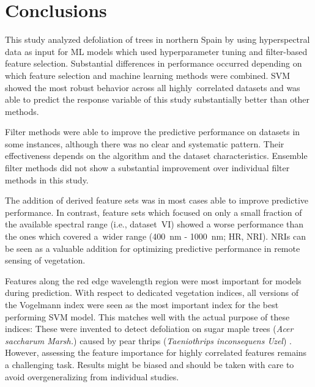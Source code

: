 \documentclass[remotesensing,article,submit,moreauthors,pdftex]{Definitions/mdpi}
\begin{document}
\section{Conclusions}

This study analyzed defoliation of trees in northern Spain by using hyperspectral data as input for ML models which used hyperparameter tuning and filter-based feature selection.
Substantial differences in performance occurred depending on which feature selection and machine learning methods were combined.
SVM showed the most robust behavior across all highly\ correlated datasets and was able to predict the response variable of this study substantially better than other methods.

Filter methods were able to improve the predictive performance on datasets in some instances, although there was no clear and systematic pattern.
Their effectiveness depends on the algorithm and the dataset characteristics.
Ensemble filter methods did not show a substantial improvement over individual filter methods in this study.

The addition of derived feature sets was in most cases able to improve predictive performance.
In contrast, feature sets which focused on only a small fraction of the available spectral range (i.e., dataset~VI) showed a worse performance than the ones which covered a\ wider range (400~nm - 1000~nm; HR, NRI).
NRIs can be seen as a valuable addition for optimizing predictive performance in remote sensing of vegetation.

Features along the red edge wavelength region were most important for models during prediction.
With respect to dedicated vegetation indices, all versions of the Vogelmann index were seen as the most important index for the best performing SVM model.
This matches well with the actual purpose of these indices:
These were invented to detect defoliation on sugar maple trees (\textit{Acer saccharum Marsh.}) caused by pear thrips (\textit{Taeniothrips inconsequens Uzel}) \cite{vogelmann1993}.
However, assessing the feature importance for highly correlated features remains a challenging task.
Results might be biased and should be taken with care to avoid overgeneralizing from individual studies.
\end{document}
